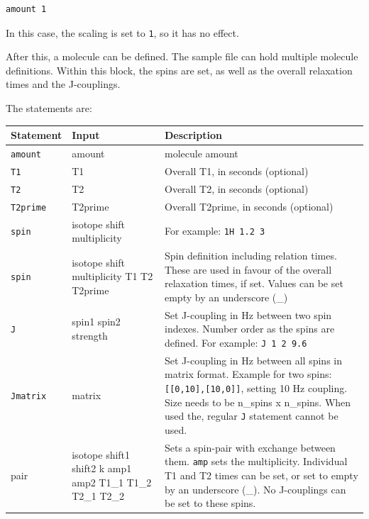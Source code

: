 \documentclass[11pt,a4paper]{article}
\begin{document}
\begin{verbatim}
amount 1 
\end{verbatim}
In this case, the scaling is set to \texttt{1}, so it has no effect.

After this, a molecule can be defined. The sample file can hold multiple molecule definitions. Within this block, the spins are set, as well as the overall relaxation times and the J-couplings.

The statements are:

\begin{center}
\begin{tabular}{lp{5cm}p{6cm}}
\toprule
\textbf{Statement} & \textbf{Input} & \textbf{Description} \\
\midrule
\rowcolor{gray!30!white}
\texttt{amount} & amount & molecule amount\\
\texttt{T1} & T1 & Overall T1, in seconds (optional)\\
\rowcolor{gray!30!white}
\texttt{T2} & T2 & Overall T2, in seconds (optional)\\
\texttt{T2prime} & T2prime & Overall T2prime, in seconds (optional)\\
\rowcolor{gray!30!white}
\texttt{spin} & isotope shift multiplicity & For example: \texttt{1H 1.2 3}\\
\texttt{spin} & isotope shift multiplicity T1 T2 T2prime & Spin definition including relation times. These are used in favour of the overall relaxation times, if set. Values can be set empty by an underscore (\_) \\
\rowcolor{gray!30!white}
\texttt{J} & spin1 spin2 strength & Set J-coupling in Hz between two spin indexes. Number order as the spins are defined. For example: \texttt{J 1 2 9.6}\\
\texttt{Jmatrix} & matrix & Set J-coupling in Hz between all spins in matrix format. Example for two spins: \texttt{[[0,10],[10,0]]}, setting 10 Hz coupling. Size needs to be n\_spins x n\_spins. When used the, regular \texttt{J} statement cannot be used.\\
\rowcolor{gray!30!white}
pair & isotope shift1 shift2 k amp1 amp2 T1\_1 T1\_2 T2\_1 T2\_2 &  Sets a spin-pair with exchange between them. \texttt{amp} sets the multiplicity. Individual T1 and T2 times can be set, or set to empty by an underscore (\_). No J-couplings can be set to these spins.\\
\bottomrule
\end{tabular}
\end{center}
\end{document}
